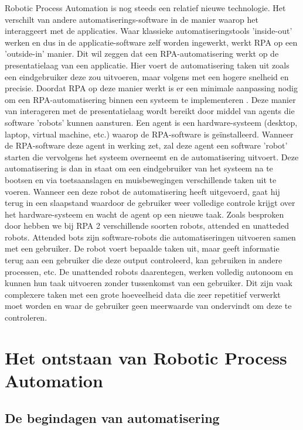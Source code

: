 Robotic Process Automation is nog steeds een relatief nieuwe technologie. Het verschilt van andere automatiserings-software in de manier waarop het interaggeert met de applicaties. Waar klassieke automatiseringstools 'inside-out' werken en dus in de applicatie-software zelf worden ingewerkt, werkt RPA op een 'outside-in' manier. Dit wil zeggen dat een RPA-automatisering werkt op de presentatielaag van een applicatie. Hier voert de automatisering taken uit zoals een eindgebruiker deze zou uitvoeren, maar volgens \textcite{Bras2023} met een hogere snelheid en precisie. Doordat RPA op deze manier werkt is er een minimale aanpassing nodig om een RPA-automatisering binnen een systeem te implementeren \autocite{Ivancic2019}.
Deze manier van interageren met de presentatielaag wordt bereikt door middel van agents die software 'robots' kunnen aansturen. Een agent is een hardware-systeem (desktop, laptop, virtual machine, etc.) waarop de RPA-software is geïnstalleerd. Wanneer de RPA-software deze agent in werking zet, zal deze agent een software 'robot' starten die vervolgens het systeem overneemt en de automatisering uitvoert. Deze automatisering is dan in staat om een eindgebruiker van het systeem na te bootsen en via toetsaanslagen en muisbewegingen verschillende taken uit te voeren. Wanneer een deze robot de automatisering heeft uitgevoerd, gaat hij terug in een slaapstand waardoor de gebruiker weer volledige controle krijgt over het hardware-systeem en wacht de agent op een nieuwe taak.
Zoals besproken door \textcite{Ivancic2019} hebben we bij RPA 2 verschillende soorten robots, attended en unatteded robots. Attended bots zijn software-robots die automatiseringen uitvoeren samen met een gebruiker. De robot voert bepaalde taken uit, maar geeft informatie terug aan een gebruiker die deze output controleerd, kan gebruiken in andere processen, etc. De unattended robots daarentegen, werken volledig autonoom en kunnen hun taak uitvoeren zonder tussenkomst van een gebruiker. Dit zijn vaak complexere taken met een grote hoeveelheid data die zeer repetitief verwerkt moet worden en waar de gebruiker geen meerwaarde van ondervindt om deze te controleren.

\section{Het ontstaan van Robotic Process Automation}

\subsection{De begindagen van automatisering}

